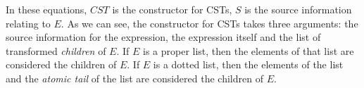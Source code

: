 In these equations, $CST$ is the constructor for CSTs, $S$ is the
source information relating to $E$.  As we can see, the constructor
for CSTs takes three arguments: the source information for the
expression, the expression itself and the list of transformed
\emph{children} of $E$.  If $E$ is a proper list, then the elements of
that list are considered the children of $E$.  If $E$ is a dotted
list, then the elements of the list and the \emph{atomic tail} of the
list are considered the children of $E$.
